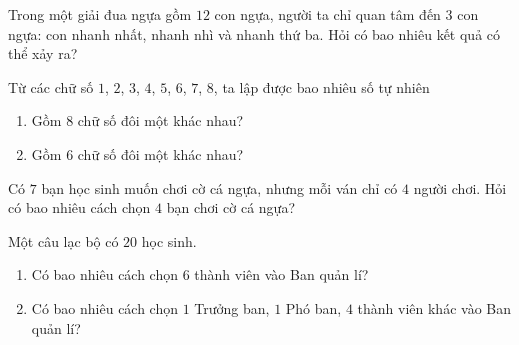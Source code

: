 \begin{vd}%
Trong một giải đua ngựa gồm $12$ con ngựa, người ta chỉ quan tâm đến $3$ con ngựa: con nhanh nhất, nhanh nhì và nhanh thứ ba. Hỏi có bao nhiêu kết quả có thể xảy ra?
\end{vd}

\begin{vd}%
	Từ các chữ số $1$, $2$, $3$, $4$, $5$, $6$, $7$, $8$, ta lập được bao nhiêu số tự nhiên
	\begin{enumerate}
		\item Gồm $8$ chữ số đôi một khác nhau?
		\item Gồm $6$ chữ số đôi một khác nhau?
	\end{enumerate}
\end{vd}

\begin{vd}%
Có $7$ bạn học sinh muốn chơi cờ cá ngựa, nhưng mỗi ván chỉ có $4$ người chơi. Hỏi có bao nhiêu cách chọn $4$ bạn chơi cờ cá ngựa?
\end{vd}

\begin{vd}%
	Một câu lạc bộ có $20$ học sinh.
	\begin{enumerate}
		\item Có bao nhiêu cách chọn $6$ thành viên vào Ban quản lí?
		\item Có bao nhiêu cách chọn $1$ Trưởng ban, $1$ Phó ban, $4$ thành viên khác vào Ban quản lí?
	\end{enumerate}
\end{vd}

